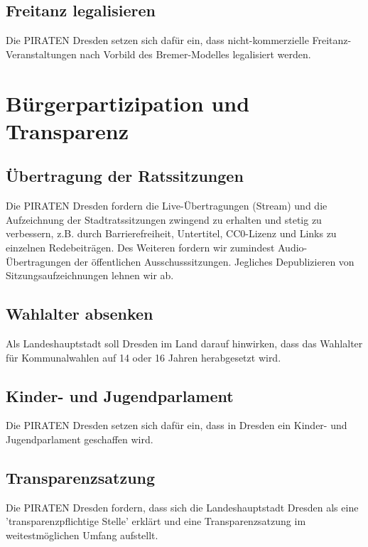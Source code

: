 \documentclass[a4paper, 11pt]{article}
\begin{document}
\subsection{Freitanz legalisieren}
Die PIRATEN Dresden setzen sich dafür ein, dass nicht-kommerzielle Freitanz-Veranstaltungen nach Vorbild des Bremer-Modelles legalisiert werden.



\section{Bürgerpartizipation und Transparenz}

\subsection{Übertragung der Ratssitzungen}
Die PIRATEN Dresden fordern die Live-Übertragungen (Stream) und die Aufzeichnung der Stadtratssitzungen zwingend zu erhalten und stetig zu verbessern, z.B. durch Barrierefreiheit, Untertitel, CC0-Lizenz und Links zu einzelnen Redebeiträgen. Des Weiteren fordern wir zumindest Audio-Übertragungen der öffentlichen Ausschusssitzungen. Jegliches Depublizieren von Sitzungsaufzeichnungen lehnen wir ab.




\subsection{Wahlalter absenken}
Als Landeshauptstadt soll Dresden im Land darauf hinwirken, dass das Wahlalter für Kommunalwahlen auf 14 oder 16 Jahren herabgesetzt wird.


\subsection{Kinder- und Jugendparlament}
Die PIRATEN Dresden setzen sich dafür ein, dass in Dresden ein Kinder- und Jugendparlament geschaffen wird.


\subsection{Transparenzsatzung}
Die PIRATEN Dresden fordern, dass sich die Landeshauptstadt Dresden als eine 'transparenzpflichtige Stelle' erklärt und eine Transparenzsatzung im weitestmöglichen Umfang aufstellt.
\end{document}
